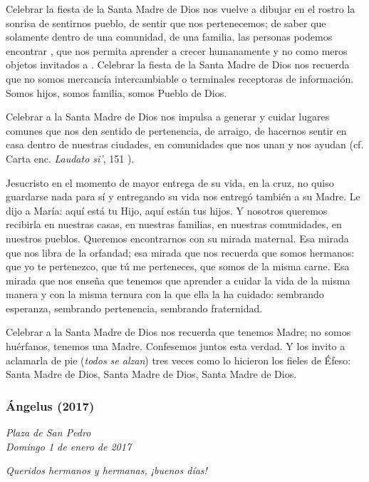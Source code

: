 \begin{body}
\begin{body}
Celebrar la fiesta de la Santa Madre de Dios nos vuelve a dibujar en el rostro la sonrisa de sentirnos pueblo, de sentir que nos pertenecemos; de saber que solamente dentro de una comunidad, de una familia, las personas podemos encontrar ,  que nos permita aprender a crecer humanamente y no como meros objetos invitados a . Celebrar la fiesta de la Santa Madre de Dios nos recuerda que no somos mercancía intercambiable o terminales receptoras de información. Somos hijos, somos familia, somos Pueblo de Dios.

Celebrar a la Santa Madre de Dios nos impulsa a generar y cuidar lugares comunes que nos den sentido de pertenencia, de arraigo, de hacernos sentir en casa dentro de nuestras ciudades, en comunidades que nos unan y nos ayudan (cf. Carta enc. \emph{Laudato si'}, 151 ).

Jesucristo en el momento de mayor entrega de su vida, en la cruz, no quiso guardarse nada para sí y entregando su vida nos entregó también a su Madre. Le dijo a María: aquí está tu Hijo, aquí están tus hijos. Y nosotros queremos recibirla en nuestras casas, en nuestras familias, en nuestras comunidades, en nuestros pueblos. Queremos encontrarnos con su mirada maternal. Esa mirada que nos libra de la orfandad; esa mirada que nos recuerda que somos hermanos: que yo te pertenezco, que tú me perteneces, que somos de la misma carne. Esa mirada que nos enseña que tenemos que aprender a cuidar la vida de la misma manera y con la misma ternura con la que ella la ha cuidado: sembrando esperanza, sembrando pertenencia, sembrando fraternidad.

Celebrar a la Santa Madre de Dios nos recuerda que tenemos Madre; no somos huérfanos, tenemos una Madre. Confesemos juntos esta verdad. Y los invito a aclamarla de pie (\emph{todos se alzan}) tres veces como lo hicieron los fieles de Éfeso: Santa Madre de Dios, Santa Madre de Dios, Santa Madre de Dios.

\subsubsection{Ángelus (2017)} \emph{Plaza de San Pedro\\ Domingo 1 de enero de 2017}



\emph{Queridos hermanos y hermanas, ¡buenos días!}


\end{body}
\end{body}
